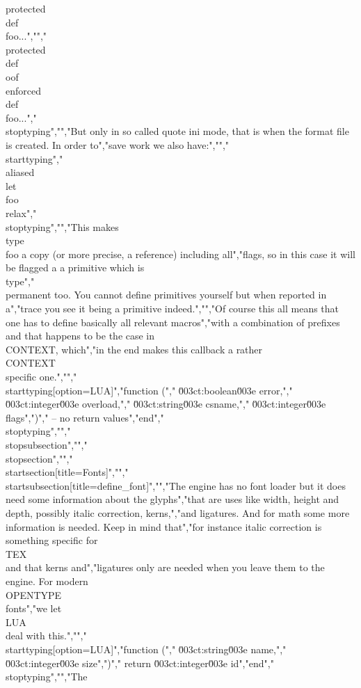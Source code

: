 protected\\def\\foo{...}","","\\protected\\def\\oof{\\enforced\\def\\foo{...}}","\\stoptyping","","But only in so called quote {ini} mode, that is when the format file is created. In order to","save work we also have:","","\\starttyping","\\aliased\\let\\foo\\relax","\\stoptyping","","This makes \\type {\\foo} a copy (or more precise, a reference) including all","flags, so in this case it will be flagged a a primitive which is \\type","{\\permanent} too. You cannot define primitives yourself but when reported in a","trace you see it being a primitive indeed.","","Of course this all means that one has to define basically all relevant macros","with a combination of prefixes and that happens to be the case in \\CONTEXT, which","in the end makes this callback a rather \\CONTEXT\\ specific one.","","\\starttyping[option=LUA]","function (","    \u003ct:boolean\u003e error,","    \u003ct:integer\u003e overload,","    \u003ct:string\u003e  csname,","    \u003ct:integer\u003e flags",")","    -- no return values","end","\\stoptyping","","\\stopsubsection","","\\stopsection","","\\startsection[title=Fonts]","","\\startsubsection[title=define_font]","","The engine has no font loader but it does need some information about the glyphs","that are uses like width, height and depth, possibly italic correction, kerns,","and ligatures. And for math some more information is needed. Keep in mind that","for instance italic correction is something specific for \\TEX\\ and that kerns and","ligatures only are needed when you leave them to the engine. For modern \\OPENTYPE\\ fonts","we let \\LUA\\ deal with this.","","\\starttyping[option=LUA]","function (","    \u003ct:string\u003e  name,","    \u003ct:integer\u003e size",")","    return \u003ct:integer\u003e id","end","\\stoptyping","","The 